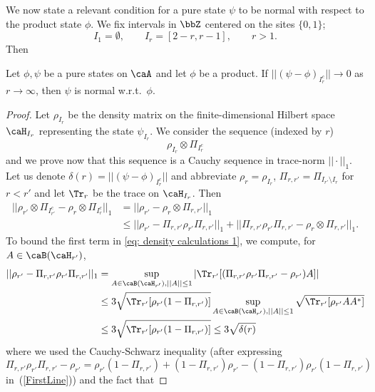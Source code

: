 We now state a relevant condition for a pure state $\psi$ to be normal with respect to the product state $\phi$. We fix intervals in $\bbZ$ centered on the sites $\{0,1\}$;
\begin{equation}\label{eq: intervals} 
I_1=\emptyset, \qquad I_r=[2-r,r-1],\qquad  r>1.
\end{equation}
Then
\begin{lemma}\label{lem: condition for normality}
	Let $\phi,\psi$ be a pure states on $\caA$ and let $\phi$ be a product.
	If $||(\psi-\phi)_{I_r^c}|| \to 0$ as $r\to \infty$, then $\psi$ is normal w.r.t.\ $\phi$. 
\end{lemma}
\begin{proof}
	Let $\rho_{I_r}$ be the density matrix on the finite-dimensional Hilbert space $\caH_{I_r}$ representing the state $\psi_{I_r}$. 
	We consider the sequence (indexed by $r$)
	\begin{equation}\label{eq: converging sequence of states}
	\rho_{I_r} \otimes \Pi_{I_r^c}
	\end{equation}
	and we prove now that this sequence is a Cauchy sequence in trace-norm $||\cdot||_1$.
	Let us denote $\delta(r)=||(\psi-\phi)_{I_r^c}|| $ and abbreviate 
	$\rho_r=\rho_{I_r}$, $\Pi_{r,r'}=\Pi_{I_{r'}\setminus I_r}$ for $r<r'$ and let $\Tr_r$ be the trace on $\caH_{I_r}$. Then 
	\begin{align}
	|| \rho_{r'} \otimes \Pi_{I_{r'}^c}- \rho_r \otimes \Pi_{I_r^c} ||_1 &= 
	|| \rho_{r'} - \rho_r \otimes \Pi_{r,r'} ||_1 \\
	&\leq  
	|| \rho_{r'} - \Pi_{r,r'} \rho_{r'}\Pi_{r,r'} ||_1+ || \Pi_{r,r'} \rho_{r'}\Pi_{r,r'}-\rho_r \otimes \Pi_{r,r'} ||_1. \label{eq: density calculations 1}
	\end{align}
	To bound the first term in \eqref{eq: density calculations 1}, we compute, for $A\in \caB(\caH_{r'})$,
	\begin{align}
	|| \rho_{r'} - \Pi_{r,r'} \rho_{r'}\Pi_{r,r'} ||_1&=\sup_{A\in \caB(\caH_{r'}), ||A||\leq 1}
	|\Tr_{r'}[(\Pi_{r,r'} \rho_{r'}\Pi_{r,r'} - \rho_{r'})A] | \label{FirstLine}\\
	&\leq 3  \sqrt{\Tr_{r'} [\rho_{r'} (1-\Pi_{r,r'})]} \sup_{A\in \caB(\caH_{r'}), ||A||\leq 1}  \sqrt{\Tr_{r'} [\rho_{r'}AA^*]}     \\
	& \leq 3  \sqrt{\Tr_{r'} [\rho_{r'} (1-\Pi_{r,r'})]} \leq 3 \sqrt{\delta(r)}
	\end{align}
	where we used the Cauchy-Schwarz inequality (after expressing $\Pi_{r,r'} \rho_{r'}\Pi_{r,r'} - \rho_{r'} = \rho_{r'}(1-\Pi_{r,r'}) + (1-\Pi_{r,r'})\rho_{r'} - (1-\Pi_{r,r'})\rho_{r'}(1-\Pi_{r,r'})$ in~(\ref{FirstLine})) and the fact that 

\end{proof}
